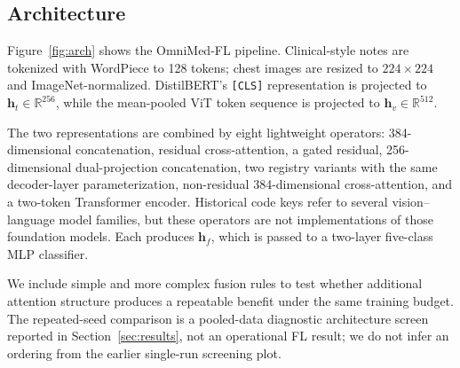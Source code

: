 \documentclass[letterpaper, conference]{IEEEtran}
\begin{document}
\subsection{Architecture}

Figure~\ref{fig:arch} shows the OmniMed-FL pipeline. Clinical-style notes are
tokenized with WordPiece to 128 tokens; chest images are resized to
$224{\times}224$ and ImageNet-normalized. DistilBERT's \texttt{[CLS]}
representation is projected to $\mathbf{h}_t\!\in\!\mathbb{R}^{256}$, while the
mean-pooled ViT token sequence is projected to
$\mathbf{h}_v\!\in\!\mathbb{R}^{512}$.

The two representations are combined by eight lightweight operators:
384-dimensional concatenation, residual cross-attention, a gated residual,
256-dimensional dual-projection concatenation, two registry variants with the
same decoder-layer parameterization, non-residual 384-dimensional
cross-attention, and a two-token Transformer encoder. Historical code keys refer
to several vision--language model families, but these operators are not
implementations of those foundation models. Each produces $\mathbf{h}_f$, which
is passed to a two-layer five-class MLP classifier.

We include simple and more complex fusion rules to test whether additional
attention structure produces a repeatable benefit under the same training budget.
The repeated-seed comparison is a pooled-data diagnostic architecture screen
reported in Section~\ref{sec:results}, not an operational FL result; we do not
infer an ordering from the earlier single-run screening plot.
\end{document}
